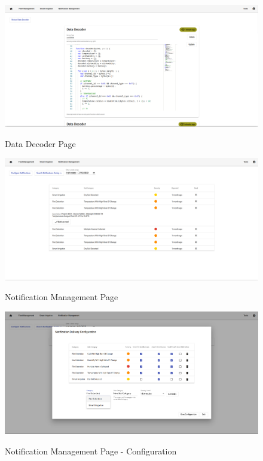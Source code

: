 \begin{figure}[H]
   \centering
   \resizebox{\columnwidth}{!}
   {
      \includegraphics{assets/figures/ui/decoder.png}
   }
   \caption[Data Processor Page]{Data Decoder Page}
   \label{fig:AppendixD:decoder}
\end{figure}

\begin{figure}[H]
   \centering
   \resizebox{\columnwidth}{!}
   {
      \includegraphics{assets/figures/ui/notification.png}
   }
   \caption[Notification Management Page]{Notification Management Page}
   \label{fig:AppendixD:notification}
\end{figure}

\begin{figure}[H]
   \centering
   \resizebox{\columnwidth}{!}
   {
      \includegraphics{assets/figures/ui/notification-configuration.png}
   }
   \caption[Notification Management Page - Configuration]{Notification Management Page - Configuration}
   \label{fig:AppendixD:notificationconfig}
\end{figure}

